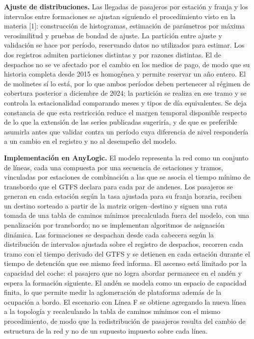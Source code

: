 \documentclass{article}
\begin{document}
\textbf{Ajuste de distribuciones.} Las llegadas de pasajeros por estación y franja y los intervalos entre
formaciones se ajustan siguiendo el procedimiento visto en la materia [1]: construcción de histogramas,
estimación de parámetros por máxima verosimilitud y pruebas de bondad de ajuste. La partición entre ajuste y
validación se hace por período, reservando datos no utilizados para estimar. Los dos registros admiten
particiones distintas y por razones distintas. El de despachos no se ve afectado por el cambio en los medios
de pago, de modo que su historia completa desde 2015 es homogénea y permite reservar un año entero. El de
molinetes sí lo está, por lo que ambos períodos deben pertenecer al régimen de cobertura posterior a
diciembre de 2024; la partición se realiza en ese tramo y se controla la estacionalidad comparando meses y
tipos de día equivalentes. Se deja constancia de que esta restricción reduce el margen temporal disponible
respecto de lo que la extensión de las series publicadas sugeriría, y de que es preferible asumirla antes
que validar contra un período cuya diferencia de nivel respondería a un cambio en el registro y no al
desempeño del modelo.

\textbf{Implementación en AnyLogic.} El modelo representa la red como un conjunto de líneas, cada una
compuesta por una secuencia de estaciones y tramos, vinculadas por estaciones de combinación a las que se
asocia el tiempo mínimo de transbordo que el GTFS declara para cada par de andenes. Los pasajeros se generan
en cada estación según la tasa ajustada para su franja horaria, reciben un destino sorteado a partir de la
matriz origen--destino y siguen una ruta tomada de una tabla de caminos mínimos precalculada fuera del
modelo, con una penalización por transbordo; no se implementan algoritmos de asignación dinámica. Las
formaciones se despachan desde cada cabecera según la distribución de intervalos ajustada sobre el registro
de despachos, recorren cada tramo con el tiempo derivado del GTFS y se detienen en cada estación durante el
tiempo de detención que ese mismo feed informa. El ascenso está limitado por la capacidad del coche: el
pasajero que no logra abordar permanece en el andén y espera la formación siguiente. El andén se modela como un espacio de
capacidad finita, lo que permite medir la aglomeración de plataforma además de la ocupación a bordo. El
escenario con Línea F se obtiene agregando la nueva línea a la topología y recalculando la tabla de
caminos mínimos con el mismo procedimiento, de modo que la redistribución de pasajeros resulta del cambio
de estructura de la red y no de un supuesto impuesto sobre cada línea.
\end{document}
